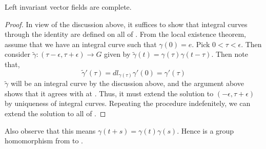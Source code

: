\documentclass{article}
\begin{document}
\begin{claim*}
    Left invariant vector fields are complete.
\end{claim*}
\begin{proof}
    In view of the discussion above, it suffices to show that integral curves through the identity are defined on all of .
    From the local existence theorem, assume that we have an integral curve  such that $\gamma(0)=e$. Pick $0<\tau<\epsilon$.
    Then consider $\tilde{\gamma}:(\tau-\epsilon,\tau+\epsilon)\to G$ given by $\tilde{\gamma}(t) = \gamma(\tau)\gamma(t-\tau)$.  Then note that, 
    $$\tilde{\gamma}'(\tau) = dl_{\gamma(\tau)}\gamma'(0) = \gamma'(\tau)$$
    $\tilde{\gamma}$ will be an integral curve by the discussion above, and the argument above shows that it agrees with \mm{\gamma} at \mm{\tau}. Thus, it must extend the solution to $(-\epsilon,\tau+\epsilon)$
    by uniqueness of integral curves. Repeating the procedure indefenitely, we can extend the solution to all of .
\end{proof}

Also observe that this means $\gamma(t+s) = \gamma(t)\gamma(s)$. Hence \mm{\gamma} is a group homomorphism from  to .
\end{document}
